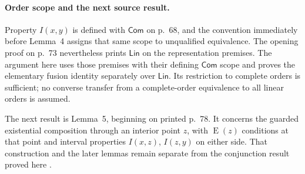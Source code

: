 \paragraph{Order scope and the next source result.}
Property \(I(x,y)\) is defined with \(\mathsf{Com}\) on p.~68, and
the convention immediately before Lemma~4 assigns that same scope to
unqualified equivalence. The opening proof on p.~73 nevertheless prints
\(\mathsf{Lin}\) on the representation premises. The argument here
uses those premises with their defining \(\mathsf{Com}\) scope and
proves the elementary fusion identity separately over \(\mathsf{Lin}\).
Its restriction to complete orders is sufficient; no converse transfer
from a complete-order equivalence to all linear orders is assumed.

The next result is Lemma~5, beginning on printed p.~78. It concerns the
guarded existential composition through an interior point \(z\), with
\(\operatorname{E}(z)\) conditions at that point and interval properties
\(I(x,z)\), \(I(z,y)\) on either side. That construction and the later
lemmas remain separate from the conjunction result proved here
\cite[ch.~III, pp.~68, 73, 78--79]{Kamp1968}.
